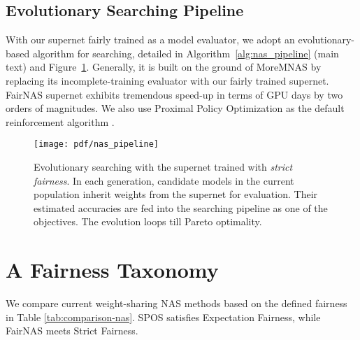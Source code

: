 \documentclass[10pt,twocolumn,letterpaper]{article}
\theoremstyle{definition}
\begin{document}
\subsection{Evolutionary Searching Pipeline}\label{sec:pipeline}
With our supernet fairly trained as a model evaluator, we adopt an evolutionary-based algorithm for searching, detailed in Algorithm~\ref{alg:nas_pipeline} (main text) and Figure~\ref{fig:fairnas}. Generally, it is built on the ground of MoreMNAS \cite{chu2019multi} by replacing its incomplete-training evaluator with our fairly trained supernet. FairNAS supernet exhibits tremendous speed-up in terms of GPU days by two orders of magnitudes. We also use Proximal Policy Optimization as the default reinforcement algorithm \cite{schulman2017proximal}.

\begin{figure}[ht]
\centering
	\texttt{[image: pdf/nas\_pipeline]}
\caption{Evolutionary searching with the supernet trained with \emph{strict fairness}. In each generation, candidate models in the current population inherit weights from the supernet for evaluation. Their estimated accuracies are fed into the searching pipeline as one of the objectives. The evolution loops till Pareto optimality.}
	\label{fig:fairnas}
\end{figure}




\section{A Fairness Taxonomy}
We compare current weight-sharing NAS methods based on the defined fairness in Table \ref{tab:comparison-nas}. SPOS \cite{guo2019single} satisfies Expectation Fairness, while FairNAS meets Strict Fairness.
\end{document}
